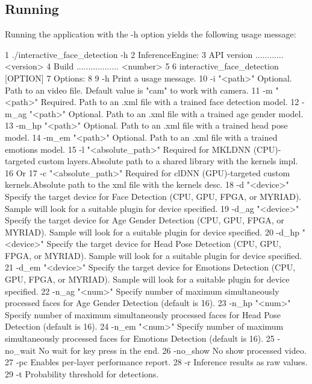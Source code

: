 \subsection*{Running}

Running the application with the {\ttfamily -\/h} option yields the following usage message\+: 
\begin{DoxyCode}
1 ./interactive\_face\_detection -h
2 InferenceEngine: 
3     API version ............ <version>
4     Build .................. <number>
5 
6 interactive\_face\_detection [OPTION]
7 Options:
8 
9     -h                         Print a usage message.
10     -i "<path>"                Optional. Path to an video file. Default value is "cam" to work with camera.
11     -m "<path>"                Required. Path to an .xml file with a trained face detection model.
12     -m\_ag "<path>"             Optional. Path to an .xml file with a trained age gender model.
13     -m\_hp "<path>"             Optional. Path to an .xml file with a trained head pose model.
14     -m\_em "<path>"             Optional. Path to an .xml file with a trained emotions model.
15       -l "<absolute\_path>"     Required for MKLDNN (CPU)-targeted custom layers.Absolute path to a shared
       library with the kernels impl.
16           Or
17       -c "<absolute\_path>"     Required for clDNN (GPU)-targeted custom kernels.Absolute path to the xml
       file with the kernels desc.
18     -d "<device>"              Specify the target device for Face Detection (CPU, GPU, FPGA, or MYRIAD).
       Sample will look for a suitable plugin for device specified.
19     -d\_ag "<device>"           Specify the target device for Age Gender Detection (CPU, GPU, FPGA, or
       MYRIAD). Sample will look for a suitable plugin for device specified.
20     -d\_hp "<device>"           Specify the target device for Head Pose Detection (CPU, GPU, FPGA, or
       MYRIAD). Sample will look for a suitable plugin for device specified.
21     -d\_em "<device>"           Specify the target device for Emotions Detection (CPU, GPU, FPGA, or
       MYRIAD). Sample will look for a suitable plugin for device specified.
22     -n\_ag "<num>"              Specify number of maximum simultaneously processed faces for Age Gender
       Detection (default is 16).
23     -n\_hp "<num>"              Specify number of maximum simultaneously processed faces for Head Pose
       Detection (default is 16).
24     -n\_em "<num>"              Specify number of maximum simultaneously processed faces for Emotions
       Detection (default is 16).
25     -no\_wait                   No wait for key press in the end.
26     -no\_show                   No show processed video.
27     -pc                        Enables per-layer performance report.
28     -r                         Inference results as raw values.
29     -t                         Probability threshold for detections.
\end{DoxyCode}


